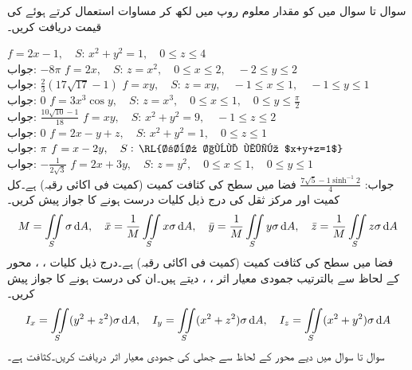 
سوال  تا سوال  میں  کو مقدار معلوم روپ میں لکھ کر مساوات  استعمال کرتے ہوئے  کی قیمت دریافت کریں۔

\quad 
$f=2x-1,\quad S:\,x^2+y^2=1,\quad 0\le z\le 4$\\
جواب:\quad 
$-8\pi$
\quad 
$f=2x,\quad S:\,z=x^2,\quad 0\le x\le 2,\quad -2\le y\le 2$\\
جواب:\quad 
$\tfrac{2}{3}(17\sqrt{17}-1)$
\quad 
$f=xy,\quad S:\,z=xy,\quad -1\le x\le 1,\quad -1\le y\le 1$\\
جواب:\quad 
$0$
\quad 
$f=3x^3\cos y,\quad S:\,z=x^3,\quad 0\le x\le 1,\quad 0\le y\le \frac{\pi}{2}$\\
جواب:\quad 
$\tfrac{10\sqrt{10}-1}{18}$
\quad 
$f=xy,\quad S:\,x^2+y^2=9,\quad -1\le z\le 2$\\
جواب:\quad 
$0$
\quad 
$f=2x-y+z,\quad S:\,x^2+y^2=1,\quad 0\le z\le 1$\\
جواب:\quad 
$\pi$
\quad 
$f=x-2y,\quad S:\,\text{\RL{ربع اول میں $x+y+z=1$}}$\\
جواب:\quad 
$-\tfrac{1}{2\sqrt{3}}$
\quad 
$f=2x+3y,\quad S:\,z=y^2,\quad  0\le x\le 1,\quad 0\le y\le 1$\\
جواب:\quad 
$\tfrac{7\sqrt{5}-1\sinh^{-1} 2}{4}$
\quad
فضا میں سطح  کی کثافت کمیت (کمیت فی اکائی رقبہ)  ہے۔کل کمیت  اور مرکز ثقل  کی درج ذیل کلیات درست ہونے کا جواز پیش کریں۔
\begin{align*}
M=\iint\limits_S \sigma \dif A,\quad \bar{x}=\frac{1}{M}\iint\limits_S x\sigma \dif A,\quad\bar{y}=\frac{1}{M}\iint\limits_S y\sigma \dif A,\quad\bar{z}=\frac{1}{M}\iint\limits_S z\sigma \dif A
\end{align*}
\quad
فضا میں سطح  کی کثافت کمیت (کمیت فی اکائی رقبہ)  ہے۔درج ذیل کلیات ، ، محور  کے لحاظ سے بالترتیب جمودی معیار اثر ، ،   دیتے ہیں۔ان کی درست ہونے کا جواز پیش کریں۔
\begin{align*}
I_x=\iint\limits_S (y^2+z^2)\sigma \dif A,\quad I_y=\iint\limits_S (x^2+z^2)\sigma \dif A,\quad I_z=\iint\limits_S (x^2+y^2)\sigma \dif A
\end{align*}
سوال  تا سوال  میں دیے محور کے لحاظ سے جھلی  کی جمودی معیار اثر دریافت کریں۔کثافت  ہے۔

